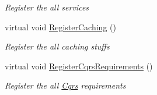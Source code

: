 \begin{DoxyCompactItemize}
\begin{DoxyCompactList}\small\item\em Register the all services \end{DoxyCompactList}\item 
virtual void \hyperlink{classCqrs_1_1Ninject_1_1Configuration_1_1CqrsModule_a6ca61a712ab7efc28eb38e7f74853e3e_a6ca61a712ab7efc28eb38e7f74853e3e}{Register\+Caching} ()
\begin{DoxyCompactList}\small\item\em Register the all caching stuffs \end{DoxyCompactList}\item 
virtual void \hyperlink{classCqrs_1_1Ninject_1_1Configuration_1_1CqrsModule_a61a20168f5dc9dab74bb2f7fad7c0adb_a61a20168f5dc9dab74bb2f7fad7c0adb}{Register\+Cqrs\+Requirements} ()
\begin{DoxyCompactList}\small\item\em Register the all \hyperlink{namespaceCqrs}{Cqrs} requirements \end{DoxyCompactList}\end{DoxyCompactItemize}
